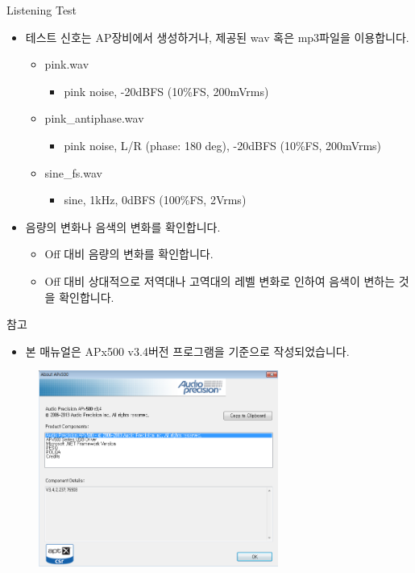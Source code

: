 \documentclass{beamer}
\begin{document}
\begin{frame}[t]{Listening Test}
\begin{itemize}
\item 테스트 신호는 AP장비에서 생성하거나, 제공된 wav 혹은 mp3파일을 이용합니다.
	\begin{itemize}
	\item pink.wav
		\begin{itemize}
		\item pink noise, -20dBFS (10\%FS, 200mVrms)
		\end{itemize}
	\item pink\_antiphase.wav
		\begin{itemize}
		\item pink noise, L/R (phase: 180 deg), -20dBFS (10\%FS, 200mVrms)
		\end{itemize}
	\item sine\_fs.wav
		\begin{itemize}
		\item sine, 1kHz, 0dBFS (100\%FS, 2Vrms)
		\end{itemize}
	\end{itemize}
\item 음량의 변화나 음색의 변화를 확인합니다.
	\begin{itemize}
	\item Off 대비 음량의 변화를 확인합니다.
	\item Off 대비 상대적으로 저역대나 고역대의 레벨 변화로 인하여 음색이 변하는 것을 확인합니다.
	\end{itemize}
\end{itemize}

\end{frame}


\begin{frame}[t]{참고}
	\begin{itemize}
	\item 본 매뉴얼은 APx500 v3.4버전 프로그램을 기준으로 작성되었습니다.
	\end{itemize}

	\begin{figure}
		\begin{center}
		\includegraphics[width=0.7\textwidth]{figure/apsetting/apx_version.png}
		\end{center}
	\end{figure}
\end{frame}
\end{document}
